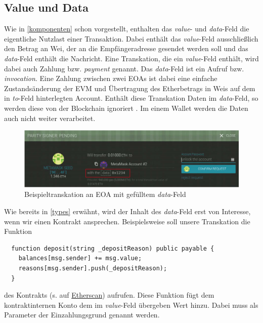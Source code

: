 \documentclass[runningheads]{llncs}
\begin{document}
\subsection{Value und Data}
\label{valData}
Wie in \ref{komponenten} schon vorgestellt, enthalten das \textit{value}- und \textit{data}-Feld die eigentliche Nutzlast einer Transaktion. Dabei enthält das \textit{value}-Feld ausschließlich den Betrag an Wei, der an die Empfängeradresse gesendet werden soll und das \textit{data}-Feld enthält die Nachricht.
Eine Transkation, die ein \textit{value}-Feld enthält, wird dabei auch Zahlung bzw. \textit{payment} genannt. Das \textit{data}-Feld ist ein Aufruf bzw. \textit{invocation}\cite[S.108]{antonopoulos_mastering_2019}. Eine Zahlung zwischen zwei EOAs ist dabei eine einfache Zustandsänderung der EVM und Übertragung des Etherbetrags in Weis auf dem in \textit{to}-Feld hinterlegten Account. Enthält diese Transkation Daten im \textit{data}-Feld, so werden diese von der Blockchain ignoriert \cite[S.10]{wood_ethereum/yellowpaper_2019}. Im einem Wallet werden die Daten auch nicht weiter verarbeitet.
\begin{figure}[h!]
  \includegraphics[width=\textwidth, keepaspectratio]{dataTransaction.png}
  \caption{Beispieltranskation an EOA mit gefülltem \textit{data}-Feld \cite[S.109]{antonopoulos_mastering_2019}}
\end{figure}

Wie bereits in \ref{types} erwähnt, wird der Inhalt des \textit{data}-Feld erst von Interesse, wenn wir einen Kontrakt ansprechen.
Beispielsweise soll unsere Transkation die Funktion
\begin{verbatim}
  function deposit(string _depositReason) public payable {
    balances[msg.sender] += msg.value;
    reasons[msg.sender].push(_depositReason);
  }
\end{verbatim}
des Kontrakts (s. auf \href{https://ropsten.etherscan.io/address/0xd76595f64aaf9a79f27cf6831788f7575f0c7f38#code}{Etherscan}) aufrufen. Diese Funktion fügt dem kontraktinternen Konto dem im \textit{value}-Feld übergeben Wert hinzu. Dabei muss als Parameter der Einzahlungsgrund genannt werden.
\end{document}
